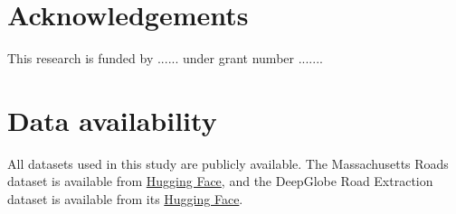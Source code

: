 \documentclass[a4paper,fleqn, review]{cas-sc}
\begin{document}
\section*{Acknowledgements}

This research is funded by ...... under grant number .......


\section*{Data availability}
All datasets used in this study are publicly available. The Massachusetts Roads
dataset is available from
\href{https://huggingface.co/datasets/k4nnguyen/massachusetts-roads}{Hugging Face}, and the DeepGlobe Road Extraction dataset is available from its
\href{https://huggingface.co/datasets/k4nnguyen/deepglobe-roads}{Hugging Face}.





\end{document}
